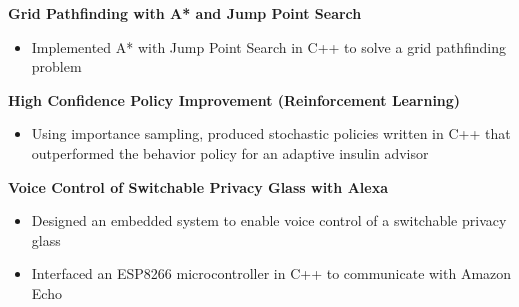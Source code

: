 \documentclass[letterpaper,11pt]{article}
\begin{document}
         
    \textbf{Grid Pathfinding with A* and Jump Point Search} 
    \vspace{-4pt}
        \begin{itemize}
            \item Implemented A* with Jump Point Search in C++ to solve a grid pathfinding problem
        \end{itemize}
    \vspace{-2pt}
    
    \textbf{High Confidence Policy Improvement (Reinforcement Learning)} 
    \vspace{-4pt}
        \begin{itemize}
            \item Using importance sampling, produced stochastic policies written in C++ that outperformed the behavior policy for an adaptive insulin advisor
        \end{itemize}
    \vspace{-2pt}
    
    \textbf{Voice Control of Switchable Privacy Glass with Alexa} 
    \vspace{-4pt}
        \begin{itemize}
  	 \item Designed an embedded system to enable voice control of a switchable privacy glass
            \vspace{-3pt}
            \item Interfaced an ESP8266 microcontroller in C++ to communicate with Amazon Echo
        \end{itemize}
        
\end{document}
